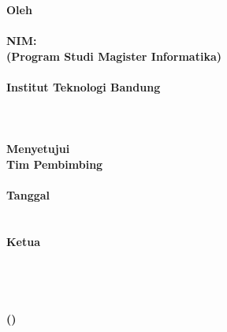 \clearpage
{}

\begin{spacing}{1}
\begin{center}
  \smallskip
  \large \bfseries \MakeUppercase{\Title}\\
  \hfill\\
  \hfill\\
  \normalsize \normalfont Oleh\\
  \large \bfseries \AuthorName\\
  NIM:~\MakeUppercase{\AuthorNIM}\\
  \normalsize (Program Studi Magister Informatika)\\
  \hfill\\
  \normalsize \normalfont Institut Teknologi Bandung \\
  \hfill\\
  \hfill\\
  \hfill\\
  Menyetujui\\
  Tim Pembimbing\\
  \hfill\\
  Tanggal \ThesisDate \\
  \hfill\\
  \hfill\\
  Ketua\\
  \hfill\\
  \hfill\\
  \hfill\\
  \hfill\\
  (\SupervisorName)
\end{center}
\end{spacing}
